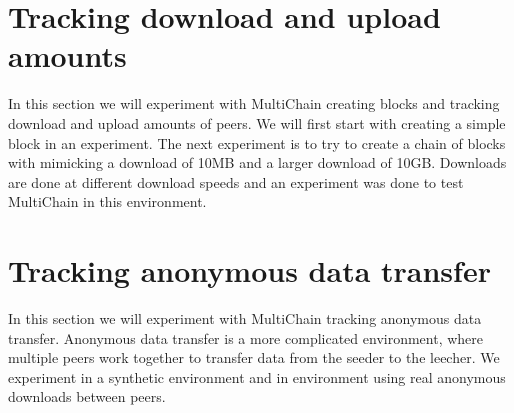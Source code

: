 

\section{Tracking download and upload amounts}
In this section we will experiment with MultiChain creating blocks and tracking download and upload amounts of peers.
We will first start with creating a simple block in an experiment.
The next experiment is to try to create a chain of blocks with mimicking a download of 10MB
and a larger download of 10GB.
Downloads are done at different download speeds and an experiment was done to test MultiChain in this environment.





\section{Tracking anonymous data transfer}
In this section we will experiment with MultiChain tracking anonymous data transfer.
Anonymous data transfer is a more complicated environment,
where multiple peers work together to transfer data from the seeder to the leecher.
We experiment in a synthetic environment and in environment using real anonymous downloads between peers.







